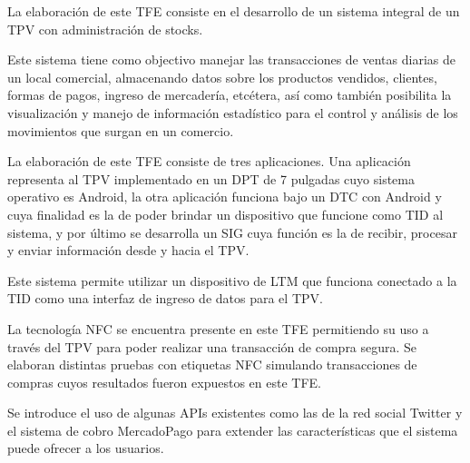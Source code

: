 


{%
\slshape

La elaboraci\'on de este \ac{TFE} consiste en el desarrollo de un sistema integral de un \ac{TPV} con administraci\'on de stocks.

Este sistema tiene como objectivo manejar las transacciones de ventas diarias de un local comercial, almacenando datos sobre los productos vendidos, clientes, formas de pagos, ingreso de mercader\'ia, etc\'etera, as\'i como tambi\'en posibilita la visualizaci\'on y manejo de informaci\'on estad\'istico para el control y an\'alisis de los movimientos que surgan en un comercio.

La elaboraci\'on de este \ac{TFE} consiste de tres aplicaciones. Una aplicaci\'on representa al \ac{TPV} implementado en un \acf{DPT} de 7 pulgadas cuyo sistema operativo es Android\Si{\texttrademark}, la otra aplicaci\'on funciona bajo un \ac{DTC} con Android\Si{\texttrademark} y cuya finalidad es la de poder brindar un dispositivo que funcione como \ac{TID} al sistema, y por \'ultimo se desarrolla un \ac{SIG} cuya funci\'on es la de recibir, procesar y enviar informaci\'on desde y hacia el \ac{TPV}. 

Este sistema permite utilizar un dispositivo de \ac{LTM} que funciona conectado a la \ac{TID} como una interfaz de ingreso de datos para el \ac{TPV}. 

La tecnolog\'ia \ac{NFC} se encuentra presente en este \ac{TFE} permitiendo su uso a trav\'es del \ac{TPV} para poder realizar una transacci\'on de compra segura. Se elaboran distintas pruebas con etiquetas \ac{NFC} simulando transacciones de compras cuyos resultados fueron expuestos en este \ac{TFE}.

Se introduce el uso de algunas \ac{APIs} existentes como las de la red social Twitter\Si{\texttrademark} y el sistema de cobro MercadoPago\Si{\texttrademark} para extender las caracter\'isticas que el sistema puede ofrecer a los usuarios.
}
